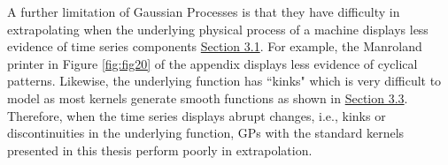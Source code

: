 A further limitation of Gaussian Processes is that they have difficulty in extrapolating when the underlying physical process of a machine displays less evidence of time series components \hyperlink{subsection.3.1}{Section 3.1}. For example, the Manroland printer in Figure \ref{fig:fig20} of the appendix displays less evidence of cyclical patterns. Likewise, the underlying function has ``kinks" which is very difficult to model as most kernels generate smooth functions as shown in \hyperlink{subsection.3.3}{Section 3.3}. Therefore, when the time series displays abrupt changes, i.e., kinks or discontinuities in the underlying function, GPs with the standard kernels presented in this thesis perform poorly in extrapolation. 
